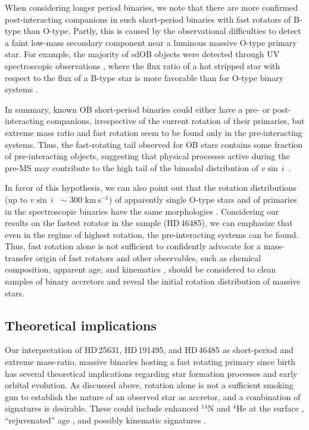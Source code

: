 \documentclass{aa}
\newcommand{\kms}{$\mathrm{km\,s^{-1}}$}
\newcommand{\vsini} {$v\sin\,i$}
\begin{document}
When considering longer period binaries, we note that there are more confirmed post-interacting companions in such short-period binaries with fast rotators of B-type than O-type.
Partly, this is caused by the observational difficulties to
detect a faint low-mass secondary component near a luminous massive O-type primary
star. For example, the majority of sdOB objects were detected through UV
spectroscopic observations \citep{Wang_2021}, where the flux ratio of
a hot stripped star with respect to the flux of a B-type star is
more favorable than for O-type binary systems \citep{Gotberg_2018}.



In summary, known OB short-period binaries could either have a pre- or
post-interacting companions, irrespective of the current rotation of
their primaries, but extreme mass ratio and fast rotation seem to be found only in the pre-interacting systems.
Thus, the fast-rotating tail observed for OB stars contains
some fraction of pre-interacting objects, suggesting that physical
  processes active during the pre-MS may contribute to the high tail of the
bimodal distribution of \vsini~\citep{vfts_2015_otype}.

In favor of this hypothesis, we can also point out that the rotation distributions
(up to \vsini~ $\sim$ 300 \kms) of apparently single O-type stars
and of primaries in the spectroscopic binaries have the same morphologies
\citep{vfts_2015_otype}. Considering our results on
the fastest rotator in the sample (HD\,46485), we can emphasize that
even in the regime of highest rotation, the pre-interacting systems can be found. Thus, fast rotation alone is not sufficient
  to confidently advocate for a mass-transfer origin of fast rotators and other observables, such as
chemical composition, apparent age, and kinematics \citep{blaauw:61, blaauw:93, Renzo_2019runaways, Renzo_2021}, should be
considered to clean samples of binary accretors and reveal the initial rotation distribution of massive stars.  
\subsection{Theoretical implications}

Our interpretation of HD\,25631, HD\,191495, and HD\,46485 as
  short-period and extreme mass-ratio, massive binaries hosting a
  fast rotating primary since birth has several theoretical
  implications regarding star formation processes and early orbital
  evolution. As discussed above, rotation alone is not a
  sufficient smoking gun to establish the nature of an observed star
  as accretor, and a combination of signatures is desirable. These
  could include enhanced $^{14}\mathrm{N}$ and $^4\mathrm{He}$ at the
  surface \citep[e.g.,][]{blaauw:93, Renzo_2021}, ``rejuvenated'' age
  \citep[e.g.,][]{neo:77, schneider:16, renzo:23}, and possibly
  kinematic signatures \citep[e.g.,][]{Renzo_2019runaways}.
\end{document}
